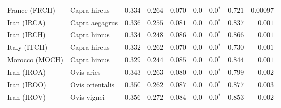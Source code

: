 \begin{center}
\begin{adjustbox}{width = 1\textwidth}
\begin{tabular}{|l|l|r|r|r|r|r|r|r|}
                  France (FRCH) &         Capra hircus &                                        $ 0.334$ &                                           $ 0.264$ &                      $ 0.070$ &            $0.0$ &                  $\bm{0.0{^*}}$ &                                           $ 0.721$ &          $0.00097$ \\
                    Iran (IRCA) &       Capra aegagrus &                                        $ 0.336$ &                                           $ 0.255$ &                      $ 0.081$ &            $0.0$ &                  $\bm{0.0{^*}}$ &                                           $ 0.837$ &           $ 0.001$ \\
                    Iran (IRCH) &         Capra hircus &                                        $ 0.334$ &                                           $ 0.248$ &                      $ 0.086$ &            $0.0$ &                  $\bm{0.0{^*}}$ &                                           $ 0.866$ &           $ 0.001$ \\
                   Italy (ITCH) &         Capra hircus &                                        $ 0.332$ &                                           $ 0.262$ &                      $ 0.070$ &            $0.0$ &                  $\bm{0.0{^*}}$ &                                           $ 0.730$ &           $ 0.001$ \\
                 Morocco (MOCH) &         Capra hircus &                                        $ 0.329$ &                                           $ 0.244$ &                      $ 0.085$ &            $0.0$ &                  $\bm{0.0{^*}}$ &                                           $ 0.844$ &           $ 0.001$ \\
                    Iran (IROA) &           Ovis aries &                                        $ 0.343$ &                                           $ 0.263$ &                      $ 0.080$ &            $0.0$ &                  $\bm{0.0{^*}}$ &                                           $ 0.799$ &           $ 0.002$ \\
                    Iran (IROO) &      Ovis orientalis &                                        $ 0.350$ &                                           $ 0.262$ &                      $ 0.087$ &            $0.0$ &                  $\bm{0.0{^*}}$ &                                           $ 0.877$ &           $ 0.003$ \\
                    Iran (IROV) &          Ovis vignei &                                        $ 0.356$ &                                           $ 0.272$ &                      $ 0.084$ &            $0.0$ &                  $\bm{0.0{^*}}$ &                                           $ 0.853$ &           $ 0.002$ \\

\end{tabular}
\end{adjustbox}
\end{center}
